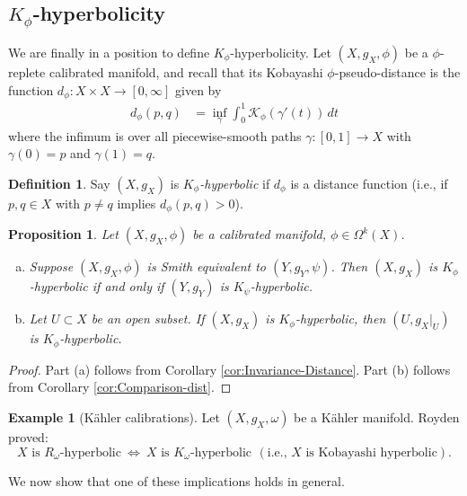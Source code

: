 \documentclass[11pt]{article}
\newtheorem{prop}[thm]{Proposition}
\theoremstyle{definition}
\newtheorem{defn}[thm]{Definition}
\newtheorem{example}[thm]{Example}
\numberwithin{equation}{section}
\begin{document}
\subsection{$K_\phi$-hyperbolicity} \label{sub:K-phi}

\indent \indent We are finally in a position to define $K_\phi$-hyperbolicity.  Let $(X, g_X, \phi)$ be a $\phi$-replete calibrated manifold, and recall that its Kobayashi $\phi$-pseudo-distance is the function $d_\phi \colon X \times X \to [0,\infty]$ given by
\begin{align*}
d_\phi(p,q) & = \inf_\gamma \int_0^1 \mathcal{K}_\phi( \gamma'(t))\,dt
\end{align*}
where the infimum is over all piecewise-smooth paths $\gamma \colon [0,1] \to X$ with $\gamma(0) = p$ and $\gamma(1) = q$. 

\begin{defn} Say $(X, g_X)$ is \emph{$K_\phi$-hyperbolic} if $d_\phi$ is a distance function (i.e., if $p, q \in X$ with $p \neq q$ implies $d_\phi(p,q) > 0$).
\end{defn}

\begin{prop} Let $(X, g_X, \phi)$ be a calibrated manifold, $\phi \in \Omega^k(X)$.
\begin{enumerate}[(a)]
\item Suppose $(X, g_X, \phi)$ is Smith equivalent to $(Y, g_Y, \psi)$.  Then $(X, g_X)$ is $K_\phi$-hyperbolic if and only if $(Y, g_Y)$ is $K_\psi$-hyperbolic.
\item Let $U \subset X$ be an open subset.  If $(X, g_X)$ is $K_\phi$-hyperbolic, then $(U, g_X|_U)$ is $K_\phi$-hyperbolic.
\end{enumerate}
\end{prop}

\begin{proof} Part (a) follows from Corollary \ref{cor:Invariance-Distance}.  Part (b) follows from Corollary \ref{cor:Comparison-dist}.
\end{proof}

\begin{example}[K\"{a}hler calibrations] Let $(X, g_X, \omega)$ be a K\"{a}hler manifold.  Royden \cite{royden2006remarks} proved:
$$X \text{ is } R_\omega\text{-hyperbolic} \ \iff \ X \text{ is }K_\omega\text{-hyperbolic} \ \, (\text{i.e., }X \text{ is Kobayashi hyperbolic}).$$
\end{example}

\noindent We now show that one of these implications holds in general.
\end{document}
